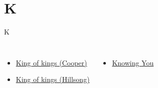 \documentclass{beamer}
\begin{document}
\section{K}

\begin{frame}{K}
\begin{columns}
    \begin{itemize}
    \item \hyperlink{King of kings[](Cooper)1}{King of kings (Cooper)}
    \item \hyperlink{King of kings[](Hillsong)1}{King of kings (Hillsong)}
\end{itemize}
    \begin{itemize}
    \item \hyperlink{Knowing You['All I once held dear']1}{Knowing You }
\end{itemize}


\end{columns}

\end{frame}
\end{document}
